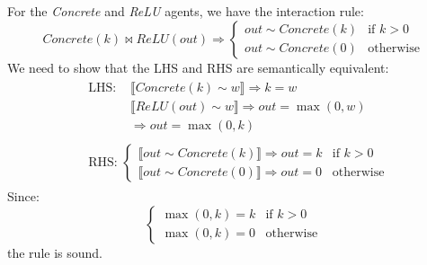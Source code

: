 \begin{lemma}
	For the \textit{Concrete} and \textit{ReLU} agents, we have the interaction rule:
	$$
	\mathit{Concrete}(k) \bowtie \mathit{ReLU}(\mathit{out}) \Rightarrow
	\begin{cases}
		\mathit{out} \sim \mathit{Concrete}(k) & \text{if } k > 0 \\
		\mathit{out} \sim \mathit{Concrete}(0) & \text{otherwise}
	\end{cases}
	$$
	We need to show that the LHS and RHS are semantically equivalent:
	$$
	\begin{aligned}
		& \begin{aligned}
			\text{LHS: } & \llbracket \mathit{Concrete}(k) \sim w \rrbracket \Rightarrow k = w \\
			& \llbracket \mathit{ReLU}(\mathit{out}) \sim w \rrbracket \Rightarrow \mathit{out} = \max(0, w) \\
			& \Rightarrow \mathit{out} = \max(0, k)
		\end{aligned} \\
		& \begin{aligned}
			\text{RHS: }
			\begin{cases}
				\llbracket \mathit{out} \sim \mathit{Concrete}(k) \rrbracket \Rightarrow \mathit{out} = k & \text{if } k > 0 \\
				\llbracket \mathit{out} \sim \mathit{Concrete}(0) \rrbracket \Rightarrow \mathit{out} = 0 & \text{otherwise}
			\end{cases}
		\end{aligned}
	\end{aligned}
	$$
	Since:
	$$
	\begin{cases}
		\max(0, k) = k & \text{if } k > 0 \\
		\max(0, k) = 0 & \text{otherwise}
	\end{cases}
	$$
	the rule is sound.
\end{lemma}

